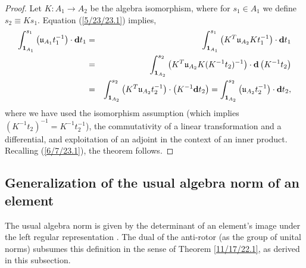 \documentclass{amsart}
\theoremstyle{definition}
\numberwithin{theorem}{section}
\numberwithin{equation}{section}
\begin{document}
\begin{proof} Let $K:A_1\rightarrow A_2$ be the algebra isomorphism, where for $s_1\in A_1$ we define $s_2\equiv Ks_1$. 
Equation (\ref{5/23/23.1}) implies,
\begin{eqnarray}\nonumber \int_{{\bf 1}_{A_1}}^{s_1} \left(\mathfrak{u}_{A_1}t_1^{-1}\right)\cdot \mathbf{d}t_1 &=& \int_{{\bf 1}_{A_1}}^{s_1} \left( K^T\mathfrak{u}_{A_2}Kt_1^{-1}\right)\cdot \mathbf{d}t_1 \\ \nonumber &=& 
\int_{{\bf 1}_{A_2}}^{s_2} \left( K^T\mathfrak{u}_{A_2}K (K^{-1}t_2)^{-1}\right)\cdot \mathbf{d}\left(K^{-1}t_2\right) \\ &=& \int_{{\bf 1}_{A_2}}^{s_2} \left(K^T\mathfrak{u}_{A_2}t_2^{-1}\right)\cdot \left(K^{-1}\mathbf{d}t_2\right) = \int_{{\bf 1}_{A_2}}^{s_2} \left(\mathfrak{u}_{A_2}t_2^{-1}\right)\cdot \mathbf{d}t_2, \label{9/6/24.2}
\end{eqnarray} 
where we have used the isomorphism assumption (which implies $(K^{-1}t_2)^{-1} = K^{-1}t_2^{-1}$), the commutativity of a linear transformation and a differential, and exploitation of an adjoint in the context of an inner product.  Recalling (\ref{6/7/23.1}), the theorem follows.
\end{proof}

\subsection{Generalization of the usual algebra norm of an element}
The usual algebra norm is given by the determinant of an element's image under the left regular representation \cite{bourbaki:1989}.  The dual of the anti-rotor (as the group of unital norms) subsumes this definition in the sense of Theorem \ref{11/17/22.1}, as derived in this subsection.  
  
  
  
\end{document}
